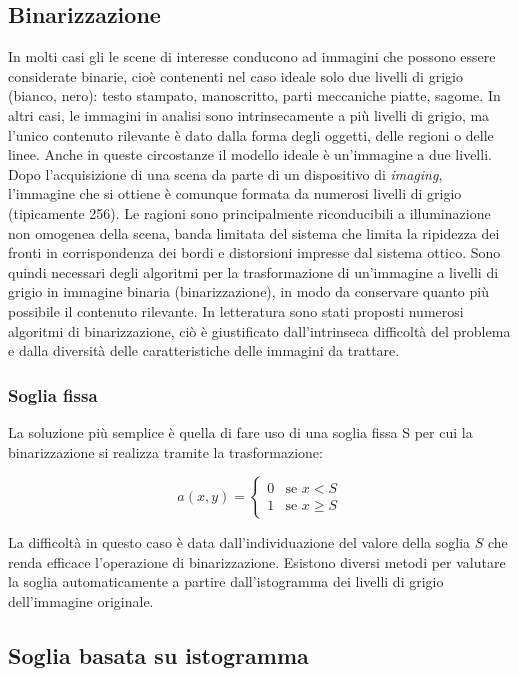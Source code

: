 \subsection{Binarizzazione} In molti casi gli le scene di interesse conducono
ad immagini che possono essere  considerate binarie, cioè contenenti nel caso
ideale solo due livelli di grigio (bianco, nero): testo stampato,
manoscritto, parti meccaniche piatte, sagome. In altri casi, le immagini in
analisi sono  intrinsecamente a più livelli di grigio, ma  l'unico contenuto
rilevante è dato dalla forma  degli oggetti, delle regioni o delle linee.
Anche in queste circostanze il modello ideale  è un'immagine a due livelli\cite{doi:10.1117/1.1631315}.
Dopo l'acquisizione di una scena da parte di un dispositivo di \emph{imaging},
l'immagine che si ottiene è comunque  formata da numerosi livelli di grigio
(tipicamente 256). Le ragioni sono principalmente riconducibili  a
illuminazione non omogenea della scena, banda limitata del sistema che limita
la ripidezza  dei fronti in corrispondenza dei bordi e distorsioni impresse
dal sistema ottico. Sono quindi necessari degli algoritmi per la
trasformazione di un'immagine a livelli di  grigio in immagine binaria
(binarizzazione), in  modo da conservare quanto più possibile il  contenuto
rilevante. In letteratura sono stati proposti numerosi  algoritmi di
binarizzazione, ciò è giustificato  dall'intrinseca difficoltà del problema e
dalla  diversità delle caratteristiche delle immagini  da trattare.


\subsubsection{Soglia fissa}

La soluzione più semplice è quella di fare uso 
di una soglia fissa S per cui la binarizzazione 
si realizza tramite la trasformazione:

\[
a(x,y) =
  \begin{cases}
   0       & \text{se } x < S \\
   1       & \text{se } x \geq S
  \end{cases}
\]

La difficoltà in questo caso è data  dall'individuazione del valore della
soglia $S$  che renda efficace l'operazione di binarizzazione. Esistono
diversi metodi per valutare la soglia  automaticamente a partire
dall'istogramma  dei livelli di grigio dell'immagine originale.

\subsection{Soglia basata su istogramma}

